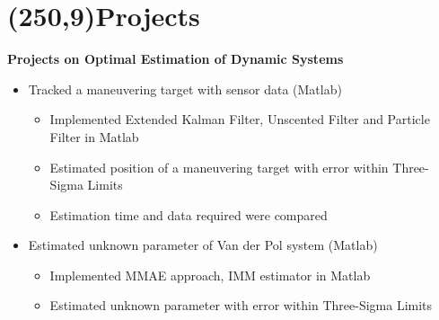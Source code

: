 \documentclass[10pt,a4paper]{extarticle}
\begin{document}
\section*{\colorbox{gray!10}{\makebox(250,9){\textcolor{blue!65}{Projects\hfill}}}}
\textbf{Projects on Optimal Estimation of Dynamic Systems}
\vspace{-0.4em}
\begin{itemize}[leftmargin = 0.6cm]
\setlength\itemsep{-0.2em}
\item Tracked a maneuvering target with sensor data (Matlab)
\vspace{-0.6em}
\begin{itemize}[leftmargin = 0.3cm]
\setlength\itemsep{-0.2em}
\item Implemented Extended Kalman Filter, Unscented Filter and Particle Filter in Matlab
\item Estimated position of a maneuvering target with error within Three-Sigma Limits
\item Estimation time and data required were compared
\end{itemize}
\item Estimated unknown parameter of Van der Pol system (Matlab)
\vspace{-0.6em}
\begin{itemize}[leftmargin = 0.3cm]
\setlength\itemsep{-0.2em}
\item Implemented MMAE approach, IMM estimator in Matlab
\item Estimated unknown parameter with error within Three-Sigma Limits
\end{itemize}

\end{itemize}
\end{document}
